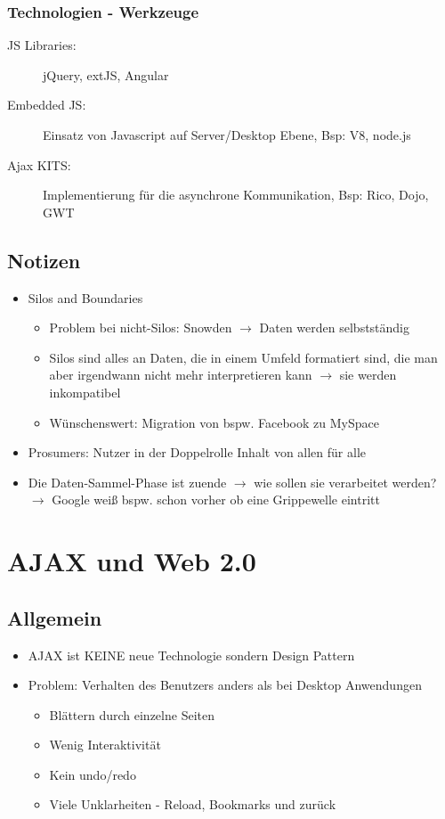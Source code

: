 \documentclass{article} %
\begin{document}
	\subsubsection{Technologien - Werkzeuge}
	\begin{description}
		\item[JS Libraries:] jQuery, extJS, Angular
		\item[Embedded JS:] Einsatz von Javascript auf Server/Desktop Ebene, Bsp: V8, node.js
		\item[Ajax KITS:] Implementierung für die asynchrone Kommunikation, Bsp: Rico, Dojo, GWT
	\end{description}
	\subsection{Notizen}
		\begin{itemize}
			\item Silos and Boundaries
				\begin{itemize}
					\item Problem bei nicht-Silos: Snowden $\rightarrow$ Daten werden selbstständig
					\item Silos sind alles an Daten, die in einem Umfeld formatiert sind, die man aber irgendwann nicht mehr interpretieren kann $\rightarrow$ sie werden inkompatibel
					\item Wünschenswert: Migration von bspw. Facebook zu MySpace
				\end{itemize}
				\item Prosumers: Nutzer in der Doppelrolle \glqq Inhalt von allen für alle\grqq
				\item Die Daten-Sammel-Phase ist zuende $\rightarrow$ wie sollen sie verarbeitet werden? $\rightarrow$ Google weiß bspw. schon vorher ob eine Grippewelle eintritt
		\end{itemize}
		
		
		
	\section{AJAX und Web 2.0}
	\subsection{Allgemein}
	\begin{itemize}
		\item AJAX ist KEINE neue Technologie sondern Design Pattern
		\item Problem: Verhalten des Benutzers anders als bei Desktop Anwendungen
		\begin{itemize}
			\item Blättern durch einzelne Seiten
			\item Wenig Interaktivität 
			\item Kein undo/redo
			\item Viele Unklarheiten - Reload, Bookmarks und zurück
		\end{itemize}
	\end{itemize}
\end{document}
